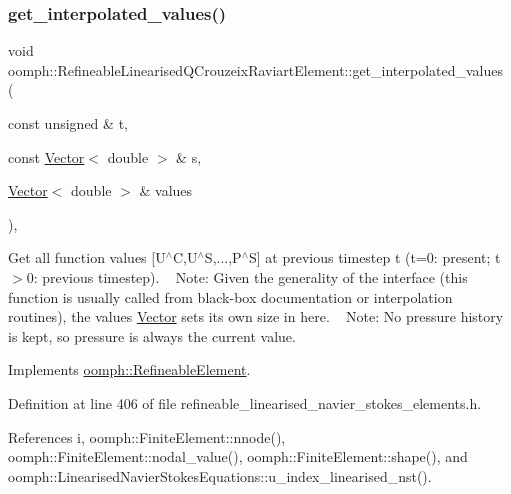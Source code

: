 \subsubsection{\texorpdfstring{get\+\_\+interpolated\+\_\+values()}{get\_interpolated\_values()}\hspace{0.1cm}{\footnotesize\ttfamily [2/2]}}
{\footnotesize\ttfamily void oomph\+::\+Refineable\+Linearised\+Q\+Crouzeix\+Raviart\+Element\+::get\+\_\+interpolated\+\_\+values (\begin{DoxyParamCaption}\item[{const unsigned \&}]{t,  }\item[{const \hyperlink{classoomph_1_1Vector}{Vector}$<$ double $>$ \&}]{s,  }\item[{\hyperlink{classoomph_1_1Vector}{Vector}$<$ double $>$ \&}]{values }\end{DoxyParamCaption})\hspace{0.3cm}{\ttfamily [inline]}, {\ttfamily [virtual]}}



Get all function values \mbox{[}U$^\wedge$C,U$^\wedge$S,...,P$^\wedge$S\mbox{]} at previous timestep t (t=0\+: present; t$>$0\+: previous timestep). ~\newline
 Note\+: Given the generality of the interface (this function is usually called from black-\/box documentation or interpolation routines), the values \hyperlink{classoomph_1_1Vector}{Vector} sets its own size in here. ~\newline
Note\+: No pressure history is kept, so pressure is always the current value. 



Implements \hyperlink{classoomph_1_1RefineableElement_ada6f0efe831ffefb1d2829ce01d45bfc}{oomph\+::\+Refineable\+Element}.



Definition at line 406 of file refineable\+\_\+linearised\+\_\+navier\+\_\+stokes\+\_\+elements.\+h.



References i, oomph\+::\+Finite\+Element\+::nnode(), oomph\+::\+Finite\+Element\+::nodal\+\_\+value(), oomph\+::\+Finite\+Element\+::shape(), and oomph\+::\+Linearised\+Navier\+Stokes\+Equations\+::u\+\_\+index\+\_\+linearised\+\_\+nst().

\mbox{\label{classoomph_1_1RefineableLinearisedQCrouzeixRaviartElement_ad47315487ff8a24b4cb68a8ae9886091}} 

